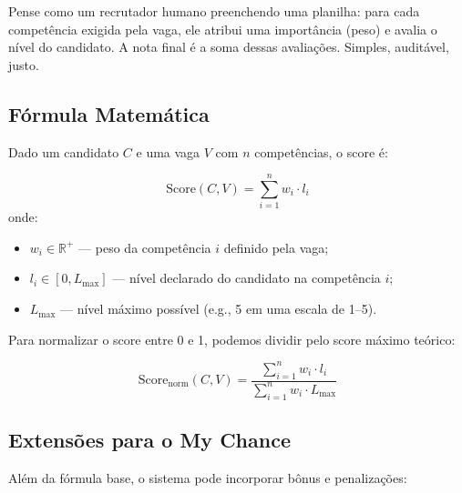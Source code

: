 \documentclass[12pt,a4paper]{article}
\begin{document}
\begin{infobox}[Intuição]
Pense como um recrutador humano preenchendo uma planilha: para cada competência
exigida pela vaga, ele atribui uma importância (peso) e avalia o nível do candidato.
A nota final é a soma dessas avaliações. Simples, auditável, justo.
\end{infobox}

\subsection{Fórmula Matemática}

Dado um candidato $C$ e uma vaga $V$ com $n$ competências, o score é:

\begin{formulabox}
\begin{equation}
  \text{Score}(C, V) = \sum_{i=1}^{n} w_i \cdot l_i
  \label{eq:wss}
\end{equation}
onde:
\begin{itemize}
  \item $w_i \in \mathbb{R}^+$ — peso da competência $i$ definido pela vaga;
  \item $l_i \in [0, L_{\max}]$ — nível declarado do candidato na competência $i$;
  \item $L_{\max}$ — nível máximo possível (e.g., 5 em uma escala de 1–5).
\end{itemize}
\end{formulabox}

\vspace{0.4cm}

Para normalizar o score entre 0 e 1, podemos dividir pelo score máximo teórico:

\begin{formulabox}
\begin{equation}
  \text{Score}_{\text{norm}}(C, V) = \frac{\sum_{i=1}^{n} w_i \cdot l_i}{\sum_{i=1}^{n} w_i \cdot L_{\max}}
  \label{eq:wss_norm}
\end{equation}
\end{formulabox}

\subsection{Extensões para o My Chance}

Além da fórmula base, o sistema pode incorporar bônus e penalizações:
\end{document}
